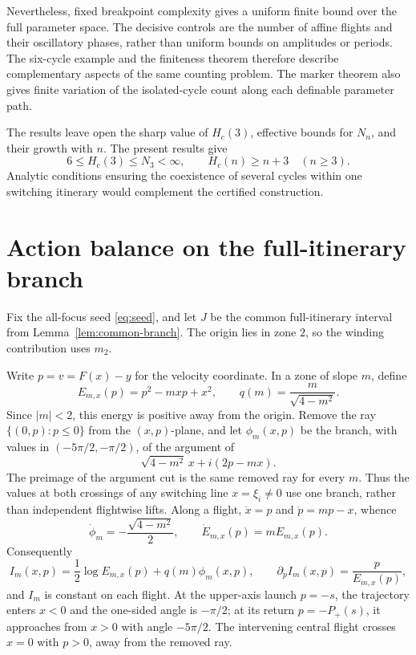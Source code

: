\documentclass[11pt]{article}
\theoremstyle{remark}
\begin{document}
Nevertheless, fixed breakpoint complexity gives a uniform finite bound
over the full parameter space.  The decisive controls are the number of
affine flights and their oscillatory phases, rather than uniform bounds
on amplitudes or periods.  The six-cycle example and the finiteness theorem
therefore describe complementary aspects of the same counting problem.
The marker theorem also gives finite variation of the isolated-cycle count
along each definable parameter path.

The results leave open the sharp value of \(H_c(3)\), effective bounds for
\(N_n\), and their growth with \(n\).  The present results give
\[
  6\le H_c(3)\le N_3<\infty,\qquad H_c(n)\ge n+3\quad(n\ge3).
\]
Analytic conditions ensuring the coexistence of several cycles within one
switching itinerary would complement the certified construction.

\appendix
\section{Action balance on the full-itinerary branch}\label{app:action}

Fix the all-focus seed \eqref{eq:seed}, and let \(J\) be the common
full-itinerary interval from Lemma~\ref{lem:common-branch}.
The origin lies in zone \(2\), so the winding contribution uses \(m_2\).

Write \(p=v=F(x)-y\) for the velocity coordinate.  In a zone of slope
\(m\), define
\[
 E_{m,x}(p)=p^2-mxp+x^2,\qquad q(m)=\frac m{\sqrt{4-m^2}}.
\]
Since \(|m|<2\), this energy is positive away from the origin.  Remove
the ray \(\{(0,p):p\le0\}\) from the \((x,p)\)-plane, and let
\(\phi_m(x,p)\) be the branch, with values in
\((-5\pi/2,-\pi/2)\), of the argument of
\[
                 \sqrt{4-m^2}\,x+i(2p-mx).
\]
The preimage of the argument cut is the same removed ray for every
\(m\).  Thus the values at both crossings of any switching line
\(x=\xi_i\ne0\) use one branch, rather than independent flightwise
lifts.  Along a flight, \(\dot x=p\) and \(\dot p=mp-x\), whence
\[
 \dot\phi_m=-\frac{\sqrt{4-m^2}}2,
 \qquad \dot E_{m,x}(p)=mE_{m,x}(p).
\]
Consequently
\begin{equation}\label{eq:focus-invariant}
 I_m(x,p)=\frac12\log E_{m,x}(p)+q(m)\phi_m(x,p),
 \qquad \partial_p I_m(x,p)=\frac p{E_{m,x}(p)},
\end{equation}
and \(I_m\) is constant on each flight.  At the upper-axis launch
\(p=-s\), the trajectory enters \(x<0\) and the one-sided angle is
\(-\pi/2\); at its return \(p=-P_+(s)\), it approaches from \(x>0\)
with angle \(-5\pi/2\).  The intervening central flight crosses
\(x=0\) with \(p>0\), away from the removed ray.
\end{document}
